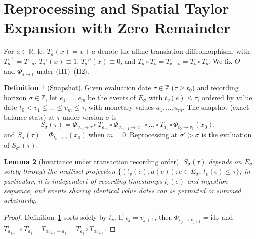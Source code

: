 \documentclass[11pt, a4paper]{article}
\theoremstyle{definition}
\newtheorem{definicao}{Definition}[section]
\theoremstyle{plain}
\newtheorem{lema}[definicao]{Lemma}
\theoremstyle{remark}
\begin{document}
\section{Reprocessing and Spatial Taylor Expansion with Zero Remainder}\label{sec:4}

For $a \in \mathbb{R}$, let $T_a(x) = x + a$ denote the affine translation diffeomorphism, with $T_a^{-1} = T_{-a}$, $T_a'(x) \equiv 1$, $T_a''(x) \equiv 0$, and $T_a \circ T_b = T_{a+b} = T_b \circ T_a$. We fix $\Theta$ and $\Phi_{s \to t}$ under (H1)--(H2).

\begin{definicao}[Snapshot]\label{def:4.1}
Given evaluation date $\tau \in \mathbb{Z}$ ($\tau \ge t_0$) and recording horizon $\sigma \in \mathbb{Z}$, let $e_1, \dots, e_m$ be the events of $E_\sigma$ with $t_v(e) \le \tau$, ordered by value date $t_0 < v_1 \le \dots \le v_m \le \tau$, with monetary values $a_1, \dots, a_m$. The snapshot (exact balance state) at $\tau$ under version $\sigma$ is
\[
S_\sigma(\tau) = \Phi_{v_m \to \tau} \circ T_{a_m} \circ \Phi_{v_{m-1} \to v_m} \circ \dots \circ T_{a_1} \circ \Phi_{t_0 \to v_1}(x_0),
\]
and $S_\sigma(\tau) = \Phi_{t_0 \to \tau}(x_0)$ when $m = 0$. Reprocessing at $\sigma' > \sigma$ is the evaluation of $S_{\sigma'}(\tau)$.
\end{definicao}

\begin{lema}[Invariance under transaction recording order]\label{lem:4.2}
$S_\sigma(\tau)$ depends on $E_\sigma$ solely through the multiset projection $\{(t_v(e), a(e)) : e \in E_\sigma,\, t_v(e) \le \tau\}$; in particular, it is independent of recording timestamps $t_c(e)$ and ingestion sequence, and events sharing identical value dates can be permuted or summed arbitrarily.
\end{lema}
\begin{proof}
Definition~\ref{def:4.1} sorts solely by $t_v$. If $v_j = v_{j+1}$, then $\Phi_{v_j \to v_{j+1}} = \mathrm{id}_{\mathbb{R}}$ and $T_{a_{j+1}} \circ T_{a_j} = T_{a_{j+1} + a_j} = T_{a_j} \circ T_{a_{j+1}}$.
\end{proof}
\end{document}
